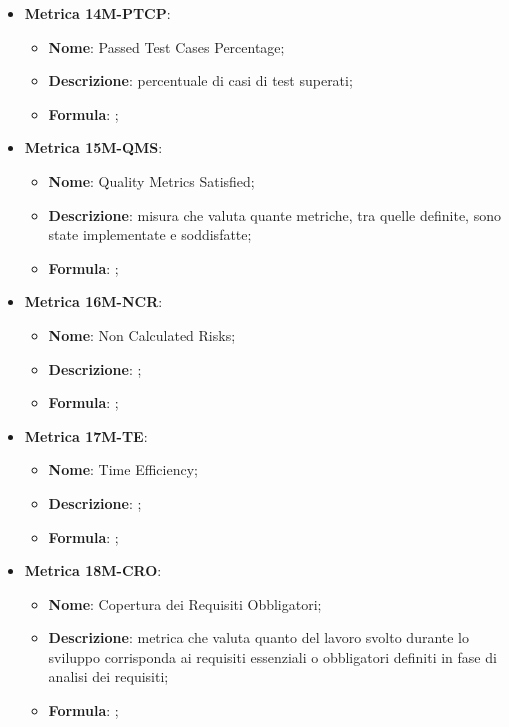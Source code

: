 \begin{itemize}
    \item \textbf{Metrica 14M-PTCP}:
    \begin{itemize}
        \item \textbf{Nome}: Passed Test Cases Percentage;
        \item \textbf{Descrizione}: percentuale di casi di test superati;
        \item \textbf{Formula}: ;
    \end{itemize}
\end{itemize}

\begin{itemize}
    \item \textbf{Metrica 15M-QMS}:
    \begin{itemize}
        \item \textbf{Nome}: Quality Metrics Satisfied;
        \item \textbf{Descrizione}: misura che valuta quante metriche, tra quelle definite, sono state implementate e soddisfatte;
        \item \textbf{Formula}: ;
    \end{itemize}
\end{itemize}

\begin{itemize}
    \item \textbf{Metrica 16M-NCR}:
    \begin{itemize}
        \item \textbf{Nome}: Non Calculated Risks;
        \item \textbf{Descrizione}: ;
        \item \textbf{Formula}: ;
    \end{itemize}
\end{itemize}

\begin{itemize}
    \item \textbf{Metrica 17M-TE}:
    \begin{itemize}
        \item \textbf{Nome}: Time Efficiency;
        \item \textbf{Descrizione}: ;
        \item \textbf{Formula}: ;
    \end{itemize}
\end{itemize}

\begin{itemize}
    \item \textbf{Metrica 18M-CRO}:
    \begin{itemize}
        \item \textbf{Nome}: Copertura dei Requisiti Obbligatori;
        \item \textbf{Descrizione}: metrica che valuta quanto del lavoro svolto durante lo sviluppo corrisponda ai requisiti essenziali o obbligatori definiti in fase di analisi dei requisiti;
        \item \textbf{Formula}: ;
    \end{itemize}
\end{itemize}

